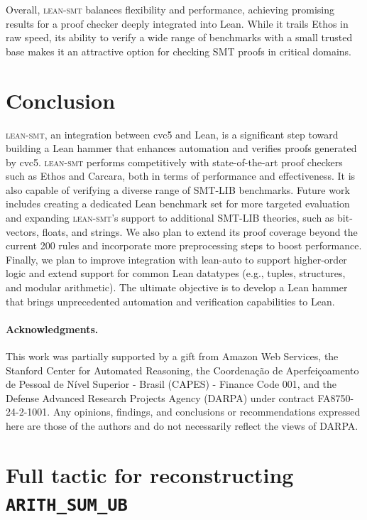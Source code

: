 \documentclass[runningheads]{llncs}
\newcommand{\tactic}{\textsc{lean-smt}\xspace}
\begin{document}
Overall, \tactic balances flexibility and performance, achieving promising
results for a proof checker deeply integrated into Lean.
%
While it trails Ethos in raw speed, its ability to verify a wide range of
benchmarks with a small trusted base makes it an attractive option for checking
SMT proofs in critical domains.

\section{Conclusion}
\tactic, an integration between cvc5 and Lean, is a significant step toward building a Lean hammer that enhances automation and verifies proofs generated by cvc5.
\tactic performs competitively with state-of-the-art proof checkers such as Ethos and Carcara, both in terms of performance and effectiveness.
It is also capable of verifying a diverse range of SMT-LIB benchmarks.
Future work includes creating a dedicated Lean benchmark set for more targeted evaluation and expanding \tactic's support to additional SMT-LIB theories, such as bit-vectors, floats, and strings.
We also plan to extend its proof coverage beyond the current 200 rules and incorporate more preprocessing steps to boost performance. Finally, we plan to improve integration with lean-auto to support higher-order logic and extend support for common Lean datatypes (e.g., tuples, structures, and modular arithmetic).
The ultimate objective is to develop a Lean hammer that brings unprecedented automation and verification capabilities to Lean.

\begin{footnotesize}
  \paragraph{Acknowledgments.}
  This work was partially supported by a gift from Amazon Web Services, the
  Stanford Center for Automated Reasoning, the Coordenação de Aperfeiçoamento de
  Pessoal de Nível Superior - Brasil (CAPES) - Finance Code 001, and the Defense
  Advanced Research Projects Agency (DARPA) under contract FA8750-24-2-1001. Any
  opinions, findings, and conclusions or recommendations expressed here are
  those of the authors and do not necessarily reflect the views of DARPA.
\end{footnotesize}




\newpage
\appendix

\section{Full tactic for reconstructing \texttt{ARITH\_SUM\_UB}}
\label{sec:rec-tactic}
\end{document}
